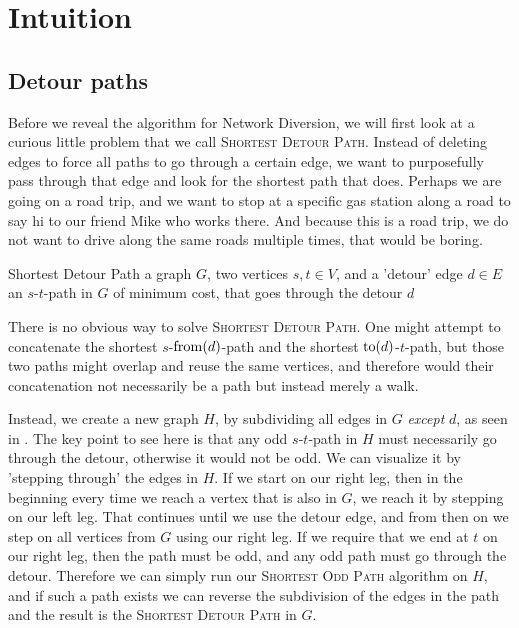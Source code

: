 \section{Intuition}
\subsection{Detour paths}
\label{section:subdividing-detours}
Before we reveal the algorithm for Network Diversion, we will first look at a curious little problem that we call \textsc{Shortest Detour Path}. Instead of deleting edges to force all paths to go through a certain edge, we want to purposefully pass through that edge and look for the shortest path that does. Perhaps we are going on a road trip, and we want to stop at a specific gas station along a road to say hi to our friend Mike who works there. And because this is a road trip, we do not want to drive along the same roads multiple times, that would be boring.

\problem
{Shortest Detour Path}
{a graph $G$, two vertices $s,t \in V$, and a 'detour' edge $d \in E$}
{an $s$-$t$-path in $G$ of minimum cost, that goes through the detour $d$}

There is no obvious way to solve \textsc{Shortest Detour Path}. One might attempt to concatenate the shortest $s$-$\operatorname{from}(d)$-path and the shortest $\operatorname{to}(d)$-$t$-path, but those two paths might overlap and reuse the same vertices, and therefore would their concatenation not necessarily be a path but instead merely a walk.


Instead, we create a new graph $H$, by subdividing all edges in $G$ \emph{except} $d$, as seen in . The key point to see here is that any odd $s$-$t$-path in $H$ must necessarily go through the detour, otherwise it would not be odd. We can visualize it by 'stepping through' the edges in $H$. If we start on our right leg, then in the beginning every time we reach a vertex that is also in $G$, we reach it by stepping on our left leg. That continues until we use the detour edge, and from then on we step on all vertices from $G$ using our right leg. If we require that we end at $t$ on our right leg, then the path must be odd, and any odd path must go through the detour. Therefore we can simply run our \textsc{Shortest Odd Path} algorithm on $H$, and if such a path exists we can reverse the subdivision of the edges in the path and the result is the \textsc{Shortest Detour Path} in $G$.

